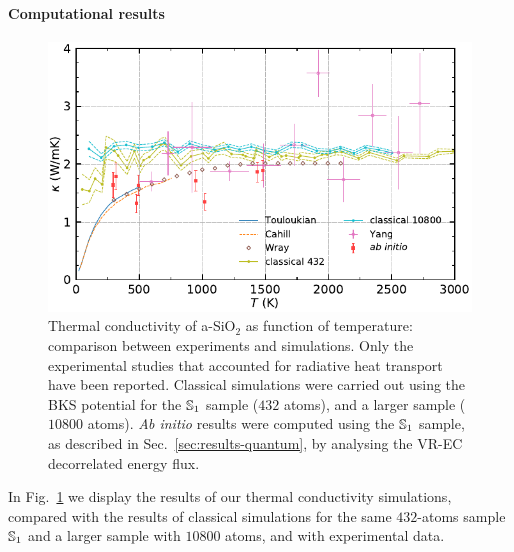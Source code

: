 \paragraph{Computational results}
\begin{figure}[!tb]
    \centering
    \includegraphics[width=\textwidth]{chapters/chapter6/figures/silica_expkappa_qkappa.pdf}
    \caption{Thermal conductivity of a-SiO$_2$ as function of temperature: comparison between experiments and simulations. 
    Only the experimental studies that accounted for radiative heat transport have been reported. 
    Classical simulations were carried out using the BKS potential for the $\S1$ sample ($432$ atoms), and a larger sample ($10800$ atoms).
    \emph{Ab initio} results were computed using the $\S1$ sample, as described in Sec.~\ref{sec:results-quantum}, by analysing the VR-EC decorrelated energy flux. 
    }
    \label{fig:results-quantum-kappa-temp}
\end{figure}
In Fig.~\ref{fig:results-quantum-kappa-temp} we display the results of our \abinitio thermal conductivity simulations, compared with the results of classical simulations for the same $432$-atoms sample $\S1$ and a larger sample with $10800$ atoms, and with experimental data. 

